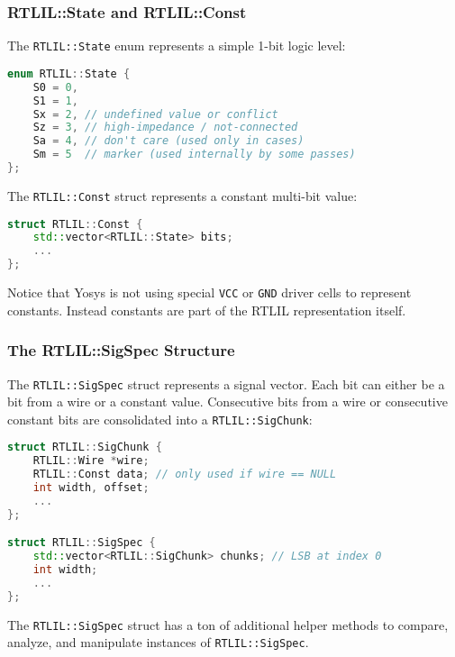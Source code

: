\subsubsection{RTLIL::State and RTLIL::Const}

\begin{frame}[t, fragile]{\subsubsecname}
The {\tt RTLIL::State} enum represents a simple 1-bit logic level:

\smallskip
\begin{lstlisting}[xleftmargin=1cm, basicstyle=\ttfamily\fontsize{8pt}{10pt}\selectfont, language=C++]
enum RTLIL::State {
    S0 = 0,
    S1 = 1,
    Sx = 2, // undefined value or conflict
    Sz = 3, // high-impedance / not-connected
    Sa = 4, // don't care (used only in cases)
    Sm = 5  // marker (used internally by some passes)
};
\end{lstlisting}

\bigskip
The {\tt RTLIL::Const} struct represents a constant multi-bit value:

\smallskip
\begin{lstlisting}[xleftmargin=1cm, basicstyle=\ttfamily\fontsize{8pt}{10pt}\selectfont, language=C++]
struct RTLIL::Const {
    std::vector<RTLIL::State> bits;
    ...
};
\end{lstlisting}

\bigskip
Notice that Yosys is not using special {\tt VCC} or {\tt GND} driver cells to represent constants. Instead
constants are part of the RTLIL representation itself.
\end{frame}

\subsubsection{The RTLIL::SigSpec Structure}

\begin{frame}[t, fragile]{\subsubsecname}
The {\tt RTLIL::SigSpec} struct represents a signal vector. Each bit can either be a bit from a wire
or a constant value. Consecutive bits from a wire or consecutive constant bits are consolidated into
a {\tt RTLIL::SigChunk}:

\bigskip
\begin{lstlisting}[xleftmargin=1cm, basicstyle=\ttfamily\fontsize{8pt}{10pt}\selectfont, language=C++]
struct RTLIL::SigChunk {
    RTLIL::Wire *wire;
    RTLIL::Const data; // only used if wire == NULL
    int width, offset;
    ...
};

struct RTLIL::SigSpec {
    std::vector<RTLIL::SigChunk> chunks; // LSB at index 0
    int width;
    ...
};
\end{lstlisting}

\bigskip
The {\tt RTLIL::SigSpec} struct has a ton of additional helper methods to compare, analyze, and
manipulate instances of {\tt RTLIL::SigSpec}.
\end{frame}

